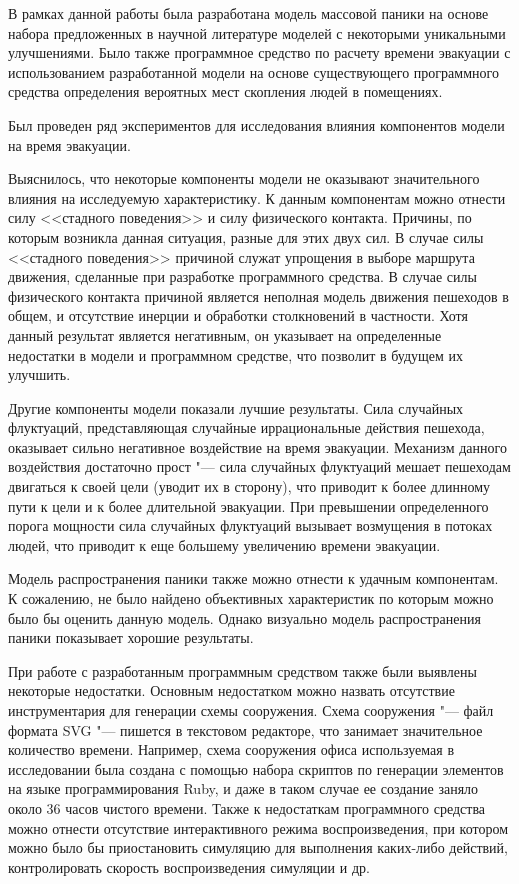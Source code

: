
\label{sec:final}

В рамках данной работы была разработана модель массовой паники на основе набора предложенных в научной литературе моделей
с некоторыми уникальными улучшениями.
Было также программное средство по расчету времени эвакуации с использованием разработанной модели на основе существующего
программного средства определения вероятных мест скопления людей в помещениях.

Был проведен ряд экспериментов для исследования влияния компонентов модели на время эвакуации.

Выяснилось, что некоторые компоненты модели не оказывают значительного влияния на исследуемую характеристику.
К данным компонентам можно отнести силу <<стадного поведения>> и силу физического контакта.
Причины, по которым возникла данная ситуация, разные для этих двух сил.
В случае силы <<стадного поведения>> причиной служат упрощения в выборе маршрута движения,
сделанные при разработке программного средства.
В случае силы физического контакта причиной является неполная модель движения пешеходов в общем,
и отсутствие инерции и обработки столкновений в частности.
Хотя данный результат является негативным, он указывает на определенные недостатки в модели и программном
средстве, что позволит в будущем их улучшить.

Другие компоненты модели показали лучшие результаты.
Сила случайных флуктуаций, представляющая случайные иррациональные действия пешехода,
оказывает сильно негативное воздействие на время эвакуации.
Механизм данного воздействия достаточно прост "--- сила случайных флуктуаций мешает
пешеходам двигаться к своей цели (уводит их в сторону), что приводит к более длинному пути
к цели и к более длительной эвакуации. При превышении определенного порога мощности
сила случайных флуктуаций вызывает возмущения в потоках людей, что приводит к еще большему
увеличению времени эвакуации.

Модель распространения паники также можно отнести к удачным компонентам.
К сожалению, не было найдено объективных характеристик по которым можно было бы оценить данную модель.
Однако визуально модель распространения паники показывает хорошие результаты.

При работе с разработанным программным средством также были выявлены некоторые недостатки.
Основным недостатком можно назвать отсутствие инструментария для генерации схемы сооружения.
Схема сооружения "--- файл формата SVG "--- пишется в текстовом редакторе, что занимает значительное количество времени.
Например, схема сооружения офиса используемая в исследовании была создана с помощью набора скриптов по генерации элементов
на языке программирования Ruby, и даже в таком случае ее создание заняло около 36 часов чистого времени.
Также к недостаткам программного средства можно отнести отсутствие интерактивного режима воспроизведения,
при котором можно было бы приостановить симуляцию для выполнения каких-либо действий, контролировать скорость
воспроизведения симуляции и др.

